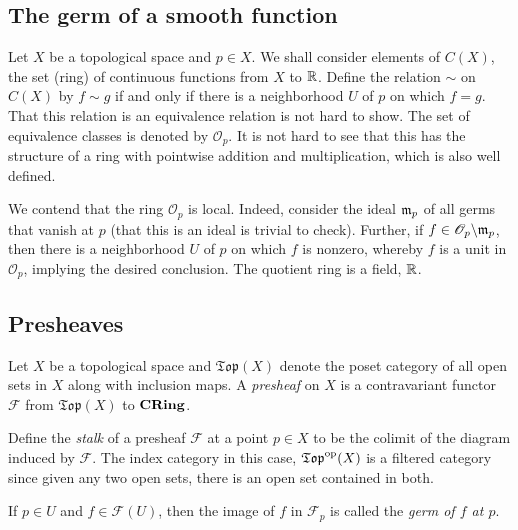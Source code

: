 \subsection{The germ of a smooth function}

Let $X$ be a topological space and $p\in X$. We shall consider elements of $C(X)$, the set (ring) of continuous functions from $X$ to $\mathbb{R}$. Define the relation $\sim$ on $C(X)$ by $f\sim g$ if and only if there is a neighborhood $U$ of $p$ on which $f = g$. That this relation is an equivalence relation is not hard to show. The set of equivalence classes is denoted by $\mathscr O_p$. It is not hard to see that this has the structure of a ring with pointwise addition and multiplication, which is also well defined.

We contend that the ring $\mathscr{O}_p$ is local. Indeed, consider the ideal $\mathfrak m_p$ of all germs that vanish at $p$ (that this is an ideal is trivial to check). Further, if $f\in\mathscr O_p\backslash\mathfrak m_p$, then there is a neighborhood $U$ of $p$ on which $f$ is nonzero, whereby $f$ is a unit in $\mathscr O_p$, implying the desired conclusion. The quotient ring is a field, $\mathbb{R}$.

\subsection{Presheaves}

\begin{definition}[Presheaf]
    Let $X$ be a topological space and $\mathfrak{Top}(X)$ denote the poset category of all open sets in $X$ along with inclusion maps. A \emph{presheaf} on $X$ is a contravariant functor $\mathscr{F}$ from $\mathfrak{Top}(X)$ to $\mathbf{CRing}$. 
\end{definition}

\begin{definition}[Stalk]
    Define the \emph{stalk} of a presheaf $\mathscr F$ at a point $p\in X$ to be the colimit of the diagram induced by $\mathscr F$. The index category in this case, $\mathfrak{Top}^{\text{op}}(X)$ is a filtered category since given any two open sets, there is an open set contained in both.

    If $p\in U$ and $f\in\mathscr F(U)$, then the image of $f$ in $\mathscr F_p$ is called the \emph{germ of $f$ at $p$}.
\end{definition}

